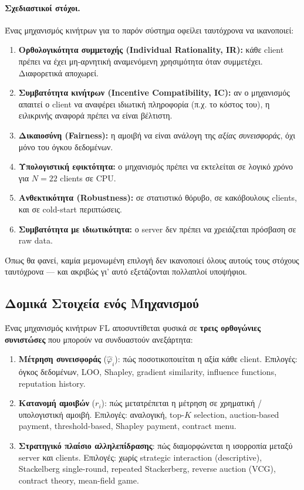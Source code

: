 \paragraph{Σχεδιαστικοί στόχοι.} Ένας μηχανισμός κινήτρων για το παρόν σύστημα οφείλει ταυτόχρονα να
ικανοποιεί:

\begin{enumerate}
    \item \textbf{Ορθολογικότητα συμμετοχής (Individual Rationality, IR):} κάθε client πρέπει να έχει
    μη-αρνητική αναμενόμενη χρησιμότητα όταν συμμετέχει. Διαφορετικά αποχωρεί.
    \item \textbf{Συμβατότητα κινήτρων (Incentive Compatibility, IC):} αν ο μηχανισμός απαιτεί ο
    client να αναφέρει ιδιωτική πληροφορία (π.χ. το κόστος του), η ειλικρινής αναφορά πρέπει να είναι
    βέλτιστη.
    \item \textbf{Δικαιοσύνη (Fairness):} η αμοιβή να είναι ανάλογη της \emph{αξίας συνεισφοράς}, όχι
    μόνο του όγκου δεδομένων.
    \item \textbf{Υπολογιστική εφικτότητα:} ο μηχανισμός πρέπει να εκτελείται σε λογικό χρόνο για
    $N = 22$ clients σε CPU.
    \item \textbf{Ανθεκτικότητα (Robustness):} σε στατιστικό θόρυβο, σε κακόβουλους clients, και σε
    cold-start περιπτώσεις.
    \item \textbf{Συμβατότητα με ιδιωτικότητα:} ο server δεν πρέπει να χρειάζεται πρόσβαση σε raw data.
\end{enumerate}

Όπως θα φανεί, καμία μεμονωμένη επιλογή δεν ικανοποιεί όλους αυτούς τους στόχους ταυτόχρονα — και
ακριβώς γι' αυτό εξετάζονται πολλαπλοί υποψήφιοι.

\subsection{Δομικά Στοιχεία ενός Μηχανισμού}
\label{subsec:inc_taxonomy}

Ένας μηχανισμός κινήτρων FL αποσυντίθεται φυσικά σε \textbf{τρεις ορθογώνιες συνιστώσες} που μπορούν
να συνδυαστούν ανεξάρτητα:

\begin{enumerate}[label=(\Alph*)]
    \item \textbf{Μέτρηση συνεισφοράς} ($\hat{\varphi}_i$): πώς ποσοτικοποιείται η αξία κάθε client.
    Επιλογές: όγκος δεδομένων, LOO, Shapley, gradient similarity, influence functions, reputation
    history.

    \item \textbf{Κατανομή αμοιβών} ($r_i$): πώς μετατρέπεται η μέτρηση σε χρηματική / υπολογιστική
    αμοιβή. Επιλογές: αναλογική, top-$K$ selection, auction-based payment, threshold-based,
    Shapley payment, contract menu.

    \item \textbf{Στρατηγικό πλαίσιο αλληλεπίδρασης}: πώς διαμορφώνεται η ισορροπία μεταξύ server και
    clients. Επιλογές: χωρίς strategic interaction (descriptive), Stackelberg single-round, repeated
    Stackerberg, reverse auction (VCG), contract theory, mean-field game.
\end{enumerate}

